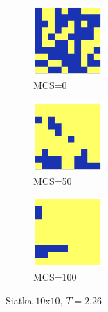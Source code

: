 \documentclass[12pt]{article}
\begin{document}
\begin{figure}[H]
  \centering

  \begin{subfigure}[b]{0.3\linewidth}
    \centering
    \includegraphics[width=100px, height=100px]{../data/snaps/snap10_temp2.26_moment1.png}
    \caption{MCS=0}
    \label{fig:image1}
  \end{subfigure}
  \hfill
  \begin{subfigure}[b]{0.3\linewidth}
    \centering
    \includegraphics[width=100px, height=100px]{../data/snaps/snap10_temp2.26_moment50.png}
    \caption{MCS=50}
    \label{fig:image2}
  \end{subfigure}
  \hfill
  \begin{subfigure}[b]{0.3\linewidth}
    \centering
    \includegraphics[width=100px, height=100px]{../data/snaps/snap10_temp2.26_moment100.png}
    \caption{MCS=100}
    \label{fig:image3}
  \end{subfigure}

  \caption{Siatka $10$x$10$, $T=2.26$}
  \label{fig:series}
\end{figure}
\end{document}
